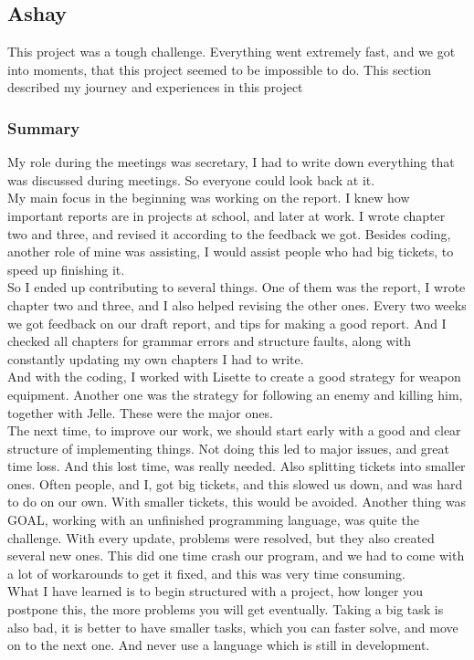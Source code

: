 \newpage
\subsection{Ashay}
This project was a tough challenge. Everything went extremely fast, and we got into moments, that this project seemed to be impossible to do. This section described my journey and experiences in this project

\subsubsection{Summary} My role during the meetings was secretary, I had to write down everything that was discussed during meetings. So everyone could look back at it. \\
My main focus in the beginning was working on the report. I knew how important reports are in projects at school, and later at work. I wrote chapter two and three, and revised it according to the feedback we got. Besides coding, another role of mine was assisting, I would assist people who had big tickets, to speed up finishing it. \\
So I ended up contributing to several things. One of them was the report, I wrote chapter two and three, and I also helped revising the other ones. Every two weeks we got feedback on our draft report, and tips for making a good report. And I checked all chapters for grammar errors and structure faults, along with constantly updating my own chapters I had to write. \\
And with the coding, I worked with Lisette to create a good strategy for weapon equipment. Another one was the strategy for following an enemy and killing him, together with Jelle. These were the major ones.\\
The next time, to improve our work, we should start early with a good and clear structure of implementing things. Not doing this led to major issues, and great time loss. And this lost time, was really needed. Also splitting tickets into smaller ones. Often people, and I, got big tickets, and this slowed us down, and was hard to do on our own. With smaller tickets, this would be avoided. Another thing was GOAL, working with an unfinished programming language, was quite the challenge. With every update, problems were resolved, but they also created several new ones. This did one time crash our program, and we had to come with a lot of workarounds to get it fixed, and this was very time consuming.\\
What I have learned is to begin structured with a project, how longer you postpone this, the more problems you will get eventually. Taking a big task is also bad, it is better to have smaller tasks, which you can faster solve, and move on to the next one. And never use a language which is still in development. 

